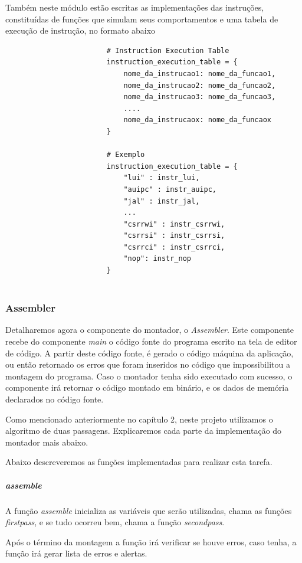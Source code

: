 					Também neste módulo estão escritas as implementações das instruções, constituídas de funções que simulam seus comportamentos e uma tabela de execução de instrução, no formato abaixo


					\begin{verbatim}
						# Instruction Execution Table
						instruction_execution_table = { 
						    nome_da_instrucao1: nome_da_funcao1,
						    nome_da_instrucao2: nome_da_funcao2,
						    nome_da_instrucao3: nome_da_funcao3,						    
						    ....
						    nome_da_instrucaox: nome_da_funcaox
						}						  		    
						
						# Exemplo
						instruction_execution_table = {
						    "lui" : instr_lui,
						    "auipc" : instr_auipc,
						    "jal" : instr_jal,
						    ...
						    "csrrwi" : instr_csrrwi,
						    "csrrsi" : instr_csrrsi,
						    "csrrci" : instr_csrrci,
						    "nop": instr_nop
						}


					\end{verbatim}

		\subsubsection{Assembler}			
			
			Detalharemos agora o componente do montador, o \textit{Assembler}. Este componente recebe do componente \textit{main} o código fonte do programa escrito na tela de editor de código. A partir deste código fonte, é gerado o código máquina da aplicação, ou então retornado os erros que foram inseridos no código que impossibilitou a montagem do programa. Caso o montador tenha sido executado com sucesso, o componente irá retornar o código montado em binário, e os dados de memória declarados no código fonte.

			Como mencionado anteriormente no capítulo 2, neste projeto utilizamos o algoritmo de duas passagens. Explicaremos cada parte da implementação do montador mais abaixo.

			Abaixo descreveremos as funções implementadas para realizar esta tarefa.

			\subparagraph{assemble}
				A função \textit{assemble} inicializa as variáveis que serão utilizadas, chama as funções \textit{first\textunderscore pass}, e se tudo ocorreu bem, chama a função \textit{second\textunderscore pass}. 

				Após o término da montagem a função irá verificar se houve erros, caso tenha, a função irá gerar lista de erros e alertas.

